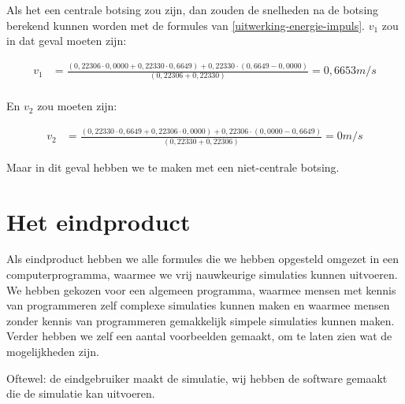\documentclass[12pt,a4paper]{article}
\begin{document}
	Als het een centrale botsing zou zijn, dan zouden de snelheden na de botsing berekend kunnen worden met de formules van \eqref{uitwerking-energie-impuls}.
	$v_1$ zou in dat geval moeten zijn:

	\begin{equation}
		\begin{aligned}
			v_1&=\frac{\left(0,22306 \cdot 0,0000+0,22330 \cdot 0,6649\right)+0,22330 \cdot \left(0,6649-0,0000\right)}{\left(0,22306+0,22330\right)}=0,6653m/s\\
		\end{aligned}
	\end{equation}

	En $v_2$ zou moeten zijn:

	\begin{equation}
		\begin{aligned}
			v_2&=\frac{\left(0,22330 \cdot 0,6649+0,22306 \cdot 0,0000\right)+0,22306 \cdot \left(0,0000-0,6649\right)}{\left(0,22330+0,22306\right)}=0m/s
		\end{aligned}
	\end{equation}

	Maar in dit geval hebben we te maken met een niet-centrale botsing.

	\newpage

	\section{Het eindproduct}
	Als eindproduct hebben we alle formules die we hebben opgesteld omgezet in een computerprogramma, waarmee we vrij nauwkeurige simulaties kunnen uitvoeren. We hebben gekozen voor een algemeen programma, waarmee mensen met kennis van programmeren zelf complexe simulaties kunnen maken en waarmee mensen zonder kennis van programmeren gemakkelijk simpele simulaties kunnen maken. Verder hebben we zelf een aantal voorbeelden gemaakt, om te laten zien wat de mogelijkheden zijn.
	
	Oftewel: de eindgebruiker maakt de simulatie, wij hebben de software gemaakt die de simulatie kan uitvoeren.
	
\end{document}
